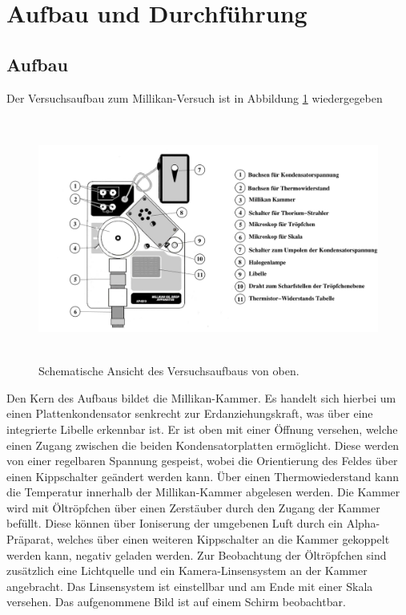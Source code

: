 \section{Aufbau und Durchführung}
\subsection{Aufbau}
\label{sec:Aufbau}

Der Versuchsaufbau zum Millikan-Versuch ist in Abbildung \ref{millikan} wiedergegeben

\begin{figure}
  \centering
  \includegraphics[height=8cm]{ressources/aufbau.png}
  \caption{Schematische Ansicht des Versuchsaufbaus von oben. \cite{skript}}
  \label{millikan}
\end{figure}


Den Kern des Aufbaus bildet die Millikan-Kammer.
Es handelt sich hierbei um einen Plattenkondensator senkrecht zur Erdanziehungskraft, was über eine integrierte Libelle erkennbar ist.
Er ist oben mit einer Öffnung versehen, welche einen Zugang zwischen die beiden Kondensatorplatten ermöglicht.
Diese werden von einer regelbaren Spannung gespeist, wobei die Orientierung des Feldes über einen Kippschalter geändert werden kann.
Über einen Thermowiederstand kann die Temperatur innerhalb der Millikan-Kammer abgelesen werden.
Die Kammer wird mit Öltröpfchen über einen Zerstäuber durch den Zugang der Kammer befüllt.
Diese können über Ioniserung der umgebenen Luft durch ein Alpha-Präparat, welches über einen weiteren Kippschalter an die Kammer gekoppelt werden kann, negativ geladen werden.
Zur Beobachtung der Öltröpfchen sind zusätzlich eine Lichtquelle und ein Kamera-Linsensystem an der Kammer angebracht.
Das Linsensystem ist einstellbar und am Ende mit einer Skala versehen.
Das aufgenommene Bild ist auf einem Schirm beobachtbar.
